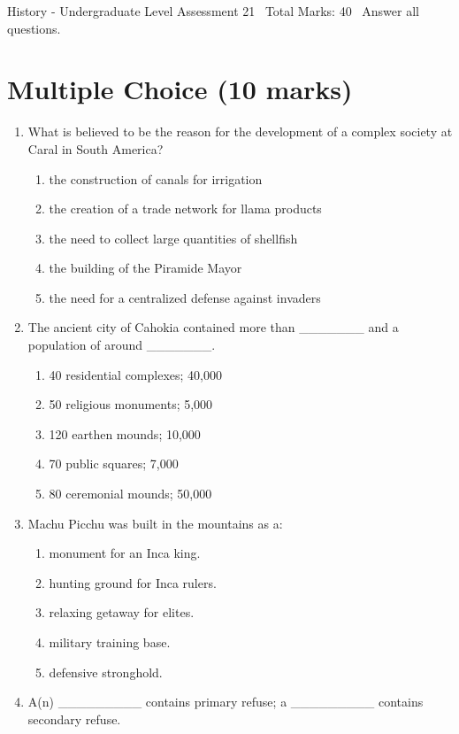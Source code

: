 \documentclass[12pt]{article}
\begin{document}
\begin{center}
History - Undergraduate Level Assessment 21 \
Total Marks: 40 \
Answer all questions.
\end{center}

\section*{Multiple Choice (10 marks)}
\begin{enumerate}[label=\arabic*.]
\item What is believed to be the reason for the development of a complex society at Caral in South America?
\begin{enumerate}[label=(\alph*)]
    \item the construction of canals for irrigation
    \item the creation of a trade network for llama products
    \item the need to collect large quantities of shellfish
    \item the building of the Piramide Mayor
    \item the need for a centralized defense against invaders
\end{enumerate}
\item The ancient city of Cahokia contained more than \_\_\_\_\_\_\_ and a population of around \_\_\_\_\_\_\_.
\begin{enumerate}[label=(\alph*)]
    \item 40 residential complexes; 40,000
    \item 50 religious monuments; 5,000
    \item 120 earthen mounds; 10,000
    \item 70 public squares; 7,000
    \item 80 ceremonial mounds; 50,000
\end{enumerate}
\item Machu Picchu was built in the mountains as a:
\begin{enumerate}[label=(\alph*)]
    \item monument for an Inca king.
    \item hunting ground for Inca rulers.
    \item relaxing getaway for elites.
    \item military training base.
    \item defensive stronghold.
\end{enumerate}
\item A(n) \_\_\_\_\_\_\_\_\_ contains primary refuse; a \_\_\_\_\_\_\_\_\_ contains secondary refuse.

\end{enumerate}
\end{document}
